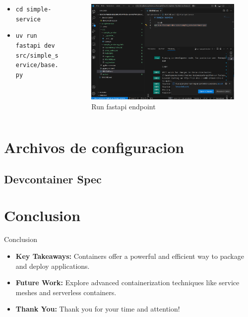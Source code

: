 \documentclass{beamer}
\begin{document}
\begin{frame}{\subsecname}
  \begin{columns}
    \begin{column}{0.5\textwidth}
      \begin{itemize}
        \item \texttt{cd simple-service}
        \item \texttt{uv run fastapi dev src/simple\_service/base.py}
      \end{itemize}
        \end{column}
        \begin{column}{0.5\textwidth}
      \begin{figure}
        \centering
        \includegraphics[width=\textwidth]{images/run-fastapi.png}
        \caption{Run fastapi endpoint}
      \end{figure}
        \end{column}
  \end{columns}
\end{frame}
\section{Archivos de configuracion}
\subsection{Devcontainer Spec}
\begin{frame}{\subsecname}

\end{frame}
\section{Conclusion}
\begin{frame}{Conclusion}
  \begin{itemize}
    \item \textbf{Key Takeaways:} Containers offer a powerful and efficient way to package and deploy applications.
    \item \textbf{Future Work:} Explore advanced containerization techniques like service meshes and serverless containers.
    \item \textbf{Thank You:} Thank you for your time and attention!
  \end{itemize}
\end{frame}
\end{document}
